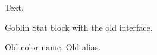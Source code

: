 \documentclass{dndbook}
\begin{document}
Text.

\begin{monsterboxbg}{Goblin}
  Stat block with the old interface.
\end{monsterboxbg}

{\color{statblockbg}Old color name.} {\color{monstertan}Old alias.}
\end{document}
